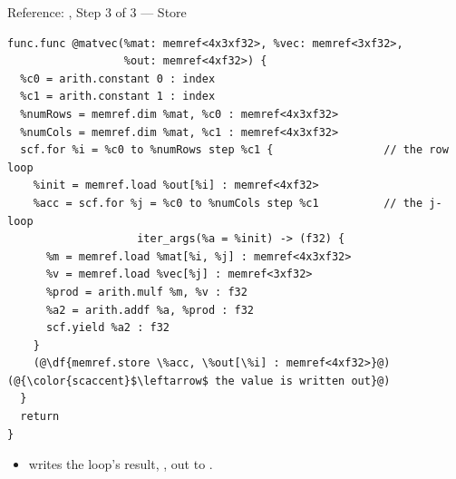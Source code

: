 \documentclass[aspectratio=169,10pt]{beamer}
\begin{document}
\begin{frame}[fragile]{Reference: , Step 3 of 3 --- Store}
\begin{lstlisting}[language=mlir]
func.func @matvec(%mat: memref<4x3xf32>, %vec: memref<3xf32>,
                  %out: memref<4xf32>) {
  %c0 = arith.constant 0 : index
  %c1 = arith.constant 1 : index
  %numRows = memref.dim %mat, %c0 : memref<4x3xf32>
  %numCols = memref.dim %mat, %c1 : memref<4x3xf32>
  scf.for %i = %c0 to %numRows step %c1 {                 // the row loop
    %init = memref.load %out[%i] : memref<4xf32>
    %acc = scf.for %j = %c0 to %numCols step %c1          // the j-loop
                    iter_args(%a = %init) -> (f32) {
      %m = memref.load %mat[%i, %j] : memref<4x3xf32>
      %v = memref.load %vec[%j] : memref<3xf32>
      %prod = arith.mulf %m, %v : f32
      %a2 = arith.addf %a, %prod : f32
      scf.yield %a2 : f32
    }
    (@\df{memref.store \%acc, \%out[\%i] : memref<4xf32>}@)           (@{\color{scaccent}$\leftarrow$ the value is written out}@)
  }
  return
}
\end{lstlisting}
  \vspace{0.4em}
  \begin{itemize}
    \item {} writes the loop's result, , out to
      .
  \end{itemize}
\end{frame}
\end{document}
